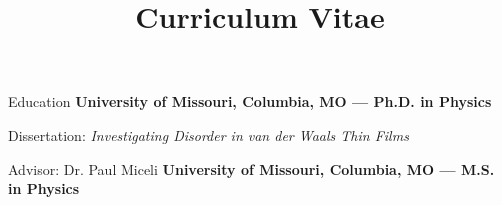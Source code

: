 \documentclass[a4paper,skipsamekey,11pt,english]{curve}
\title{Curriculum Vitae}
\begin{document}
\makeheaders[c]

\begin{rubric}{Education}
    \textbf{University of Missouri, Columbia, MO --- Ph.D. in Physics}
    \par Dissertation: \emph{Investigating Disorder in van der Waals Thin Films}
    \par Advisor: Dr. Paul Miceli
  \entry*[May 2022]%
    \textbf{University of Missouri, Columbia, MO --- M.S. in Physics}
\end{rubric}
\end{document}
